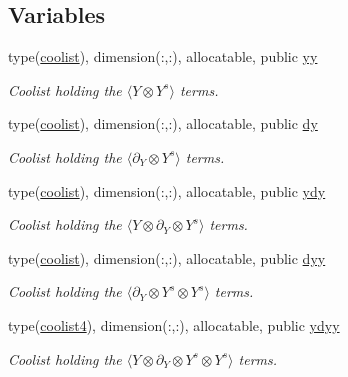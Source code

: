 \subsection*{Variables}
\begin{DoxyCompactItemize}
\item 
type(\hyperlink{structtensor_1_1coolist}{coolist}), dimension(\+:,\+:), allocatable, public \hyperlink{namespacecorr__tensor_a00e5da344c9c6c9326c13bb1006986c7}{yy}
\begin{DoxyCompactList}\small\item\em Coolist holding the $\langle Y \otimes Y^s \rangle$ terms. \end{DoxyCompactList}\item 
type(\hyperlink{structtensor_1_1coolist}{coolist}), dimension(\+:,\+:), allocatable, public \hyperlink{namespacecorr__tensor_a9bb5cad0b648cdfbca5d32eac1b73976}{dy}
\begin{DoxyCompactList}\small\item\em Coolist holding the $\langle \partial_Y \otimes Y^s \rangle$ terms. \end{DoxyCompactList}\item 
type(\hyperlink{structtensor_1_1coolist}{coolist}), dimension(\+:,\+:), allocatable, public \hyperlink{namespacecorr__tensor_a921f3b41785556ae5502a7ddf0ebf6f6}{ydy}
\begin{DoxyCompactList}\small\item\em Coolist holding the $\langle Y \otimes \partial_Y \otimes Y^s \rangle$ terms. \end{DoxyCompactList}\item 
type(\hyperlink{structtensor_1_1coolist}{coolist}), dimension(\+:,\+:), allocatable, public \hyperlink{namespacecorr__tensor_a760409e00ffdf80fe461a8d7fd5c4966}{dyy}
\begin{DoxyCompactList}\small\item\em Coolist holding the $\langle \partial_Y \otimes Y^s \otimes Y^s \rangle$ terms. \end{DoxyCompactList}\item 
type(\hyperlink{structtensor_1_1coolist4}{coolist4}), dimension(\+:,\+:), allocatable, public \hyperlink{namespacecorr__tensor_a07becc22d3c93783a90fca0e19b7dc2e}{ydyy}
\begin{DoxyCompactList}\small\item\em Coolist holding the $\langle Y \otimes \partial_Y \otimes Y^s \otimes Y^s \rangle$ terms. \end{DoxyCompactList}\item 

\end{DoxyCompactItemize}
